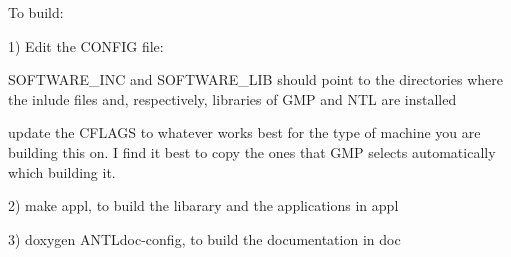 To build\-:

1) Edit the C\-O\-N\-F\-I\-G file\-:
\begin{DoxyItemize}
\item S\-O\-F\-T\-W\-A\-R\-E\-\_\-\-I\-N\-C and S\-O\-F\-T\-W\-A\-R\-E\-\_\-\-L\-I\-B should point to the directories where the inlude files and, respectively, libraries of G\-M\-P and N\-T\-L are installed
\item update the C\-F\-L\-A\-G\-S to whatever works best for the type of machine you are building this on. I find it best to copy the ones that G\-M\-P selects automatically which building it.
\end{DoxyItemize}

2) make appl, to build the libarary and the applications in appl

3) doxygen A\-N\-T\-Ldoc-\/config, to build the documentation in doc 